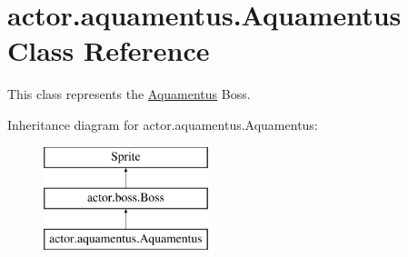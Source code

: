 \hypertarget{classactor_1_1aquamentus_1_1_aquamentus}{}\section{actor.\+aquamentus.\+Aquamentus Class Reference}
\label{classactor_1_1aquamentus_1_1_aquamentus}


This class represents the \hyperlink{classactor_1_1aquamentus_1_1_aquamentus}{Aquamentus} Boss.  


Inheritance diagram for actor.\+aquamentus.\+Aquamentus\+:\begin{figure}[H]
\begin{center}
\leavevmode
\includegraphics[height=3.000000cm]{classactor_1_1aquamentus_1_1_aquamentus}
\end{center}
\end{figure}
